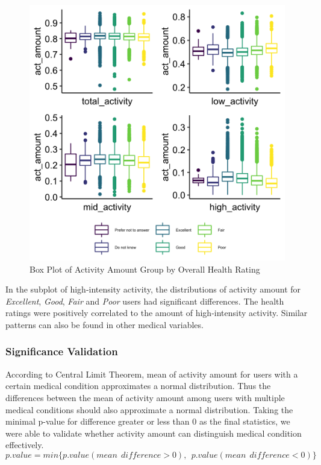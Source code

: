 \documentclass[12pt]{article}
\begin{document}
\begin{figure}[h]

{\centering \includegraphics[width=0.7\linewidth,height=0.45\textheight,]{fig2} 

}

\caption{Box Plot of Activity Amount Group by Overall Health Rating}\label{fig:unnamed-chunk-6}
\end{figure}

In the subplot of high-intensity activity, the distributions of activity
amount for \emph{Excellent}, \emph{Good}, \emph{Fair} and \emph{Poor}
users had significant differences. The health ratings were positively
correlated to the amount of high-intensity activity. Similar patterns
can also be found in other medical variables.

\hypertarget{significance-validation}{%
\subsubsection{Significance Validation}\label{significance-validation}}

According to Central Limit Theorem, mean of activity amount for users
with a certain medical condition approximates a normal distribution.
Thus the differences between the mean of activity amount among users
with multiple medical conditions should also approximate a normal
distribution. Taking the minimal p-value for difference greater or less
than 0 as the final statistics, we were able to validate whether
activity amount can distinguish medical condition effectively.\\
\[
p.value = min\{p.value(mean~~difference > 0),~~p.value(mean~~difference < 0)\}
\]
\end{document}
